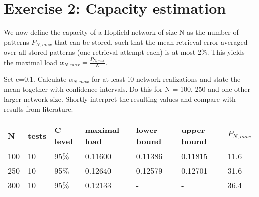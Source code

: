 \section{Exercise 2: Capacity estimation}

\begin{itshape}
\small
We now define the capacity of a Hopfield network of size N as the number of patterns $P_{N,max}$ that can be stored, such that the mean retrieval error averaged over all stored patterns (one retrieval attempt each) is at most 2$\%$. This yields the maximal load $\alpha_{N,max} = \frac{P_{N,max} }{N}$.

Set c=0.1. Calculate $\alpha_{N,max}$ for at least 10 network realizations and state the mean together with confidence intervals. Do this for N = 100, 250 and one other larger network size. Shortly interpret the resulting values and compare with results from literature.
\end{itshape}


\begin{table}[H]
\centering
\begin{tabular}{|l|l|l|l|l|l|l|}
\hline
N & tests & C-level & maximal load & lower bound & upper bound & $P_{N,max}$\\ 
\hline
\hline
100 & 10 & 95$\%$ & 0.11600 & 0.11386 & 0.11815 & 11.6 \\
250 & 10 & 95$\%$ & 0.12640 & 0.12579 & 0.12701 & 31.6 \\
300 & 10 & 95$\%$ & 0.12133 & - & -  & 36.4 \\
\hline
\end{tabular}
\end{table}


